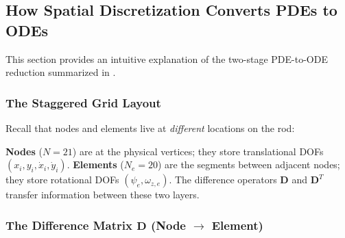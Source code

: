 \documentclass[11pt]{article}
\begin{document}
\subsection{How Spatial Discretization Converts PDEs to ODEs}
\label{app:physics:discretization-intuition}

This section provides an intuitive explanation of the two-stage PDE-to-ODE reduction summarized in .

\subsubsection{The Staggered Grid Layout}

Recall that nodes and elements live at \emph{different} locations on the rod:
\begin{center}
\end{center}

\noindent
\textbf{Nodes} ($N{=}21$) are at the physical vertices; they store translational DOFs $(x_i, y_i, \dot{x}_i, \dot{y}_i)$.
\textbf{Elements} ($N_e{=}20$) are the segments between adjacent nodes; they store rotational DOFs $(\psi_e, \omega_{z,e})$.
The difference operators $\mathbf{D}$ and $\mathbf{D}^T$ transfer information between these two layers.

\subsubsection{The Difference Matrix $\mathbf{D}$ (Node $\to$ Element)}
\end{document}
